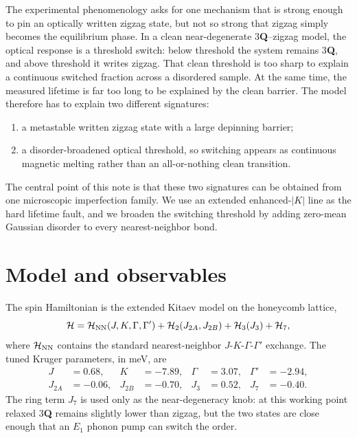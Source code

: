 \documentclass[aps,prb,twocolumn,superscriptaddress,floatfix,nofootinbib]{revtex4-2}
\newcommand{\threeQ}{3\textbf{Q}}
\begin{document}
The experimental phenomenology asks for one mechanism that is strong enough to
pin an optically written zigzag state, but not so strong that zigzag simply
becomes the equilibrium phase.  In a clean near-degenerate \threeQ--zigzag model,
the optical response is a threshold switch: below threshold the system remains
\threeQ, and above threshold it writes zigzag.  That clean threshold is too sharp
to explain a continuous switched fraction across a disordered sample.  At the
same time, the measured lifetime is far too long to be explained by the clean
barrier.  The model therefore has to explain two different signatures:
\begin{enumerate}
\item a metastable written zigzag state with a large depinning barrier;
\item a disorder-broadened optical threshold, so switching appears as continuous
magnetic melting rather than an all-or-nothing clean transition.
\end{enumerate}
The central point of this note is that these two signatures can be obtained from
one microscopic imperfection family.  We use an extended enhanced-$|K|$ line as
the hard lifetime fault, and we broaden the switching threshold by adding
zero-mean Gaussian disorder to every nearest-neighbor bond.

\section{Model and observables}

The spin Hamiltonian is the extended Kitaev model on the honeycomb lattice,
\begin{equation}
\mathcal H=\mathcal H_{\rm NN}(J,K,\Gamma,\Gamma')
+\mathcal H_{2}(J_{2A},J_{2B})+\mathcal H_{3}(J_3)+\mathcal H_7,
\end{equation}
where $\mathcal H_{\rm NN}$ contains the standard nearest-neighbor
$J$-$K$-$\Gamma$-$\Gamma'$ exchange.  The tuned Kruger
parameters, in meV, are
\begin{equation}
\begin{aligned}
J&=0.68, & K&=-7.89, & \Gamma&=3.07, & \Gamma'&=-2.94,\\
J_{2A}&=-0.06, & J_{2B}&=-0.70, & J_3&=0.52, & J_7&=-0.40.
\end{aligned}
\end{equation}
The ring term $J_7$ is used only as the near-degeneracy knob: at this
working point relaxed \threeQ{} remains slightly lower than zigzag, but the two
states are close enough that an $E_1$ phonon pump can switch the order.
\end{document}

